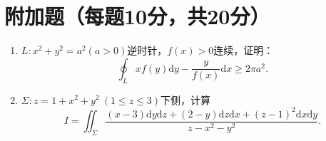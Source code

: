 \documentclass[12pt,a4paper]{ctexart}
\begin{document}
\vspace{1cm}

\section*{附加题（每题10分，共20分）}
\begin{enumerate}
\item $L:x^2+y^2=a^2(a>0)$逆时针，$f(x)>0$连续，证明：
\[
\oint_{L} x f(y) \mathrm{d}y-\frac{y}{f(x)} \mathrm{d}x \geq 2 \pi a^{2}.
\]

\item $\Sigma:z=1+x^{2}+y^{2}\ (1\le z\le3)$下侧，计算
\[
I=\iint_{\Sigma } \frac{(x-3) \mathrm{d}y \mathrm{d}z+(2-y) \mathrm{d}z \mathrm{d}x+(z-1)^{2} \mathrm{d}x \mathrm{d}y}{z-x^{2}-y^{2}}.
\]
\end{enumerate}
\end{document}
